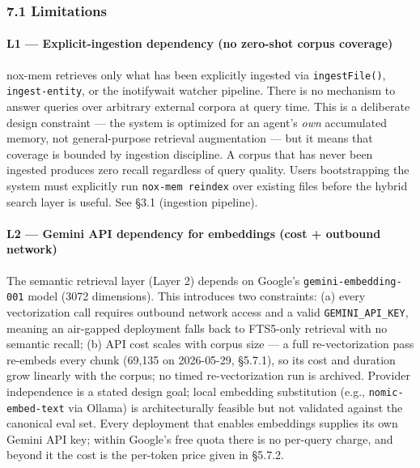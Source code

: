 \documentclass[
]{article}
\begin{document}
\subsubsection{7.1 Limitations}\label{limitations}

\paragraph{L1 --- Explicit-ingestion dependency (no zero-shot corpus
coverage)}\label{l1-explicit-ingestion-dependency-no-zero-shot-corpus-coverage}

nox-mem retrieves only what has been explicitly ingested via
\texttt{ingestFile()}, \texttt{ingest-entity}, or the inotifywait
watcher pipeline. There is no mechanism to answer queries over arbitrary
external corpora at query time. This is a deliberate design constraint
--- the system is optimized for an agent's \emph{own} accumulated
memory, not general-purpose retrieval augmentation --- but it means that
coverage is bounded by ingestion discipline. A corpus that has never
been ingested produces zero recall regardless of query quality. Users
bootstrapping the system must explicitly run \texttt{nox-mem\ reindex}
over existing files before the hybrid search layer is useful. See §3.1
(ingestion pipeline).

\paragraph{L2 --- Gemini API dependency for embeddings (cost + outbound
network)}\label{l2-gemini-api-dependency-for-embeddings-cost-outbound-network}

The semantic retrieval layer (Layer 2) depends on Google's
\texttt{gemini-embedding-001} model (3072 dimensions). This introduces
two constraints: (a) every vectorization call requires outbound network
access and a valid \texttt{GEMINI\_API\_KEY}, meaning an air-gapped
deployment falls back to FTS5-only retrieval with no semantic recall;
(b) API cost scales with corpus size --- a full re-vectorization pass
re-embeds every chunk (69,135 on 2026-05-29, §5.7.1), so its cost and
duration grow linearly with the corpus; no timed re-vectorization run is
archived. Provider independence is a stated design goal; local embedding
substitution (e.g., \texttt{nomic-embed-text} via Ollama) is
architecturally feasible but not validated against the canonical eval
set. Every deployment that enables embeddings supplies its own Gemini
API key; within Google's free quota there is no per-query charge, and
beyond it the cost is the per-token price given in §5.7.2.
\end{document}
